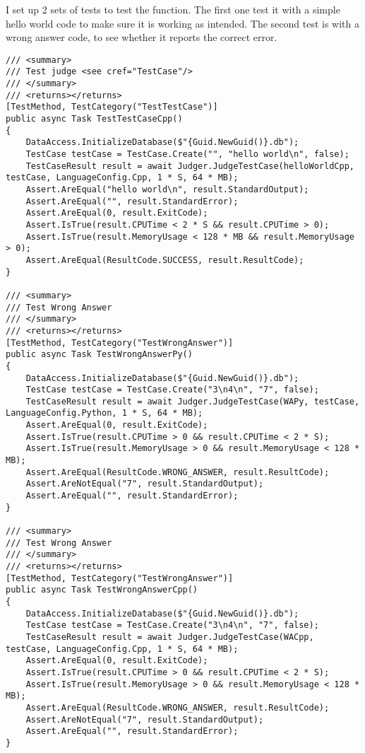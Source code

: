 \documentclass[report.tex]{subfiles}
\begin{document}
I set up 2 sets of tests to test the  function. The first one test it with a simple hello world code to make sure it is working as intended. The second test is with a wrong answer code, to see whether it reports the correct error.

\begin{verbatim}
/// <summary>
/// Test judge <see cref="TestCase"/>
/// </summary>
/// <returns></returns>
[TestMethod, TestCategory("TestTestCase")]
public async Task TestTestCaseCpp()
{
    DataAccess.InitializeDatabase($"{Guid.NewGuid()}.db");
    TestCase testCase = TestCase.Create("", "hello world\n", false);
    TestCaseResult result = await Judger.JudgeTestCase(helloWorldCpp, testCase, LanguageConfig.Cpp, 1 * S, 64 * MB);
    Assert.AreEqual("hello world\n", result.StandardOutput);
    Assert.AreEqual("", result.StandardError);
    Assert.AreEqual(0, result.ExitCode);
    Assert.IsTrue(result.CPUTime < 2 * S && result.CPUTime > 0);
    Assert.IsTrue(result.MemoryUsage < 128 * MB && result.MemoryUsage > 0);
    Assert.AreEqual(ResultCode.SUCCESS, result.ResultCode);
}

/// <summary>
/// Test Wrong Answer
/// </summary>
/// <returns></returns>
[TestMethod, TestCategory("TestWrongAnswer")]
public async Task TestWrongAnswerPy()
{
    DataAccess.InitializeDatabase($"{Guid.NewGuid()}.db");
    TestCase testCase = TestCase.Create("3\n4\n", "7", false);
    TestCaseResult result = await Judger.JudgeTestCase(WAPy, testCase, LanguageConfig.Python, 1 * S, 64 * MB);
    Assert.AreEqual(0, result.ExitCode);
    Assert.IsTrue(result.CPUTime > 0 && result.CPUTime < 2 * S);
    Assert.IsTrue(result.MemoryUsage > 0 && result.MemoryUsage < 128 * MB);
    Assert.AreEqual(ResultCode.WRONG_ANSWER, result.ResultCode);
    Assert.AreNotEqual("7", result.StandardOutput);
    Assert.AreEqual("", result.StandardError);
}

/// <summary>
/// Test Wrong Answer
/// </summary>
/// <returns></returns>
[TestMethod, TestCategory("TestWrongAnswer")]
public async Task TestWrongAnswerCpp()
{
    DataAccess.InitializeDatabase($"{Guid.NewGuid()}.db");
    TestCase testCase = TestCase.Create("3\n4\n", "7", false);
    TestCaseResult result = await Judger.JudgeTestCase(WACpp, testCase, LanguageConfig.Cpp, 1 * S, 64 * MB);
    Assert.AreEqual(0, result.ExitCode);
    Assert.IsTrue(result.CPUTime > 0 && result.CPUTime < 2 * S);
    Assert.IsTrue(result.MemoryUsage > 0 && result.MemoryUsage < 128 * MB);
    Assert.AreEqual(ResultCode.WRONG_ANSWER, result.ResultCode);
    Assert.AreNotEqual("7", result.StandardOutput);
    Assert.AreEqual("", result.StandardError);
}
\end{verbatim}
\end{document}
